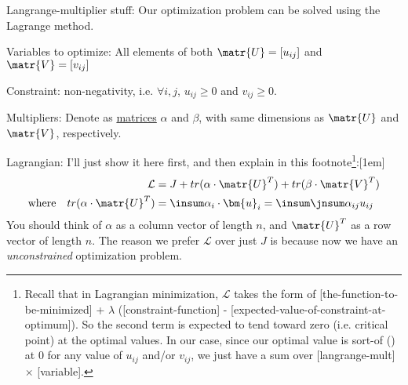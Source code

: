 \documentclass[11pt]{article}
\renewcommand\vec[2][]{\bm{#2}_{#1}}
\newcommand\p{\Needspace{10\baselineskip} \noindent}
\begin{document}
\p Langrange-multiplier stuff: Our optimization problem can be solved using the Lagrange method.
\begin{compactitem}
	\item Variables to optimize: All elements of both $\matr{U} = [u_{ij}]$ and $\matr{V} = [v_{ij}]$
	\item Constraint: non-negativity, i.e. $\forall i,j$, $u_{ij} \ge 0$ and $v_{ij} \ge 0$. 
	\item Multipliers: Denote as \underline{matrices} $\alpha$ and $\beta$, with same dimensions as $\matr{U}$ and $\matr{V}$, respectively. 
	\item Lagrangian: I'll just show it here first, and then explain in this footnote\footnote{
		 Recall that in Lagrangian minimization, $\mathcal{L}$ takes the form of [the-function-to-be-minimized] + $\lambda$ ([constraint-function] - [expected-value-of-constraint-at-optimum]). So the second term is expected to tend toward zero (i.e. critical point) at the optimal values. In our case, since our optimal value is sort-of () at 0 for any value of $u_{ij}$ and/or $v_{ij}$, we just have a sum over [langrange-mult] $\times$ [variable]. 
		}:
	\begin{align}
		\mathcal{L} &= J + tr(\alpha \cdot \matr{U}^T) + tr(\beta \cdot \matr{V}^T) \\
		\text{where} \quad tr(\alpha \cdot \matr{U}^T) 
			&= \insum \alpha_i \cdot \vec[i]{u}
			= \insum \jnsum \alpha_{ij} u_{ij}
	\end{align}
	You should think of $\alpha$ as a column vector of length $n$, and $\matr{U}^T$ as a row vector of length $n$. The reason we prefer $\mathcal{L}$ over just $J$ is because now we have an \textit{unconstrained} optimization problem.
	

\end{compactitem}
\end{document}
